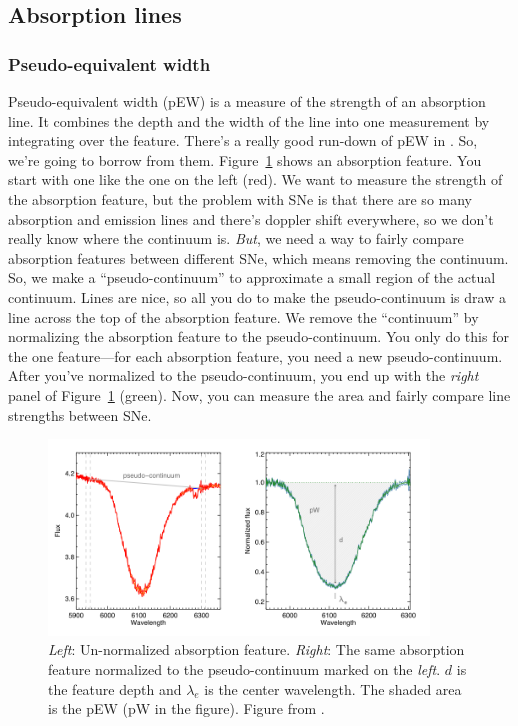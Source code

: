 \subsection{Absorption lines}
\subsubsection{Pseudo-equivalent width}
Pseudo-equivalent width (pEW) is a measure of the strength of an absorption line. It combines the depth and the width of the line into one measurement by integrating over the feature. There's a really good run-down of pEW in \cite{Galbany2015}. So, we're going to borrow from them. Figure~\ref{fig:pew} shows an absorption feature. You start with one like the one on the left (red). We want to measure the strength of the absorption feature, but the problem with SNe is that there are so many absorption and emission lines and there's doppler shift everywhere, so we don't really know where the continuum is. \textit{But}, we need a way to fairly compare absorption features between different SNe, which means removing the continuum. So, we make a ``pseudo-continuum'' to approximate a small region of the actual continuum. Lines are nice, so all you do to make the pseudo-continuum is draw a line across the top of the absorption feature. We remove the ``continuum'' by normalizing the absorption feature to the pseudo-continuum. You only do this for the one feature---for each absorption feature, you need a new pseudo-continuum. After you've normalized to the pseudo-continuum, you end up with the \textit{right} panel of Figure~\ref{fig:pew} (green). Now, you can measure the area and fairly compare line strengths between SNe. 

\begin{figure}[h!]
    \centering
    \includegraphics[width=0.9\textwidth]{figs/Screenshot from 2022-07-12 16-05-37.png}
    \caption{\textit{Left}: Un-normalized absorption feature. \textit{Right}: The same absorption feature normalized to the pseudo-continuum marked on the \textit{left}. $d$ is the feature depth and $\lambda_{e}$ is the center wavelength. The shaded area is the pEW (pW in the figure). Figure from \cite{Galbany2015}.}
    \label{fig:pew}
\end{figure}

